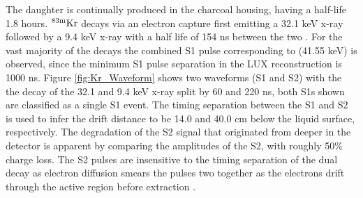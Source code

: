 \noindent The daughter \KrCal is continually produced in the charcoal housing, having a half-life 1.8 hours. $\rm^{83m}Kr$ decays via an electron capture first emitting a 32.1 keV x-ray followed by a 9.4 keV x-ray with a half life of 154 ns between the two \cite{Start_Kr} \cite{Kastens}.  For the vast majority of the decays the combined S1 pulse corresponding to (41.55 keV) is observed, since the minimum S1 pulse separation in the LUX reconstruction is 1000 ns. Figure \ref{fig:Kr_Waveform} shows two \KrCal waveforms (S1 and S2) with the the decay of the 32.1 and 9.4 keV x-ray split by 60 and 220 ns, both S1s shown are classified as a single S1 event. The timing separation between the S1 and S2 is used to infer the drift distance to be 14.0 and 40.0 cm below the liquid surface, respectively. The degradation of the S2 signal that originated from deeper in the detector is apparent by comparing the amplitudes of the S2, with roughly 50\% charge loss. The S2 pulses are insensitive to the timing separation of the dual decay as electron diffusion smears the pulses two together as the electrons drift through the active region before extraction \cite{Electron_Diffusion}.

